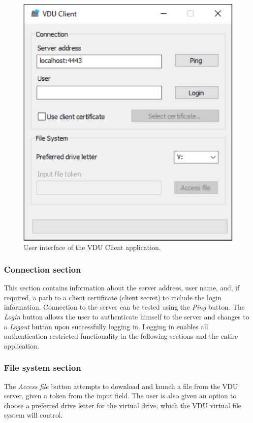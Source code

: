 \begin{figure}[htb]
    \centering
    \includegraphics[]{obrazky-figures/clientui.pdf}
	\caption{User interface of the VDU Client application.}
	\label{clientui}
\end{figure}

\subsubsection{Connection section}
This section contains information about the server address, user name, and, if required, a path to a client certificate (client secret) to include the login information. Connection to the server can be tested using the \textit{Ping} button. The \textit{Login} button allows the user to authenticate himself to the server and changes to a \textit{Logout} button upon successfully logging in. Logging in enables all authentication restricted functionality in the following sections and the entire application.

\subsubsection{File system section}
The \textit{Access file} button attempts to download and launch a file from the VDU server, given a token from the input field. The user is also given an option to choose a preferred drive letter for the virtual drive, which the VDU virtual file system will control.

